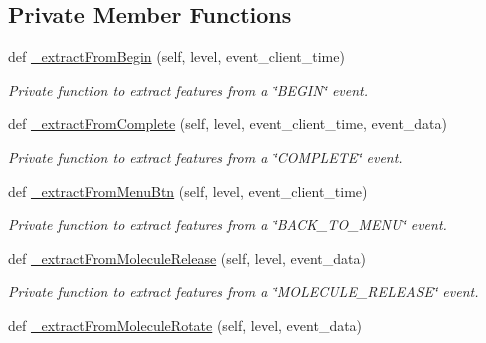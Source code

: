 \subsection*{Private Member Functions}
\begin{DoxyCompactItemize}
\item 
def \mbox{\hyperlink{classfeature__extractors_1_1_crystal_extractor_1_1_crystal_extractor_a85c2bdd0c3fe28398b783eafe1f0cbf2}{\+\_\+extract\+From\+Begin}} (self, level, event\+\_\+client\+\_\+time)
\begin{DoxyCompactList}\small\item\em Private function to extract features from a \char`\"{}\+B\+E\+G\+I\+N\char`\"{} event. \end{DoxyCompactList}\item 
def \mbox{\hyperlink{classfeature__extractors_1_1_crystal_extractor_1_1_crystal_extractor_a6e5f9339f47a3a6b84bf65285e330769}{\+\_\+extract\+From\+Complete}} (self, level, event\+\_\+client\+\_\+time, event\+\_\+data)
\begin{DoxyCompactList}\small\item\em Private function to extract features from a \char`\"{}\+C\+O\+M\+P\+L\+E\+T\+E\char`\"{} event. \end{DoxyCompactList}\item 
def \mbox{\hyperlink{classfeature__extractors_1_1_crystal_extractor_1_1_crystal_extractor_ac1b89594e83806ff6075259c596e0c38}{\+\_\+extract\+From\+Menu\+Btn}} (self, level, event\+\_\+client\+\_\+time)
\begin{DoxyCompactList}\small\item\em Private function to extract features from a \char`\"{}\+B\+A\+C\+K\+\_\+\+T\+O\+\_\+\+M\+E\+N\+U\char`\"{} event. \end{DoxyCompactList}\item 
def \mbox{\hyperlink{classfeature__extractors_1_1_crystal_extractor_1_1_crystal_extractor_ab8d672619c0ae4495d273406b935c112}{\+\_\+extract\+From\+Molecule\+Release}} (self, level, event\+\_\+data)
\begin{DoxyCompactList}\small\item\em Private function to extract features from a \char`\"{}\+M\+O\+L\+E\+C\+U\+L\+E\+\_\+\+R\+E\+L\+E\+A\+S\+E\char`\"{} event. \end{DoxyCompactList}\item 
def \mbox{\hyperlink{classfeature__extractors_1_1_crystal_extractor_1_1_crystal_extractor_ad9596536a08c941fdad97c72ab2262fe}{\+\_\+extract\+From\+Molecule\+Rotate}} (self, level, event\+\_\+data)

\end{DoxyCompactItemize}
